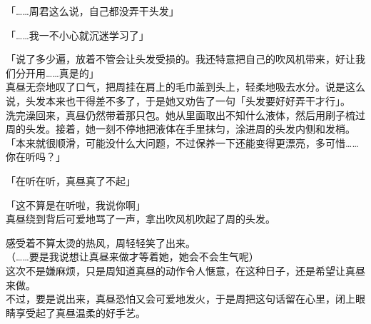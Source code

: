 「……周君这么说，自己都没弄干头发」

「……我一不小心就沉迷学习了」

「说了多少遍，放着不管会让头发受损的。我还特意把自己的吹风机带来，好让我们分开用……真是的」\\

真昼无奈地叹了口气，把周挂在肩上的毛巾盖到头上，轻柔地吸去水分。说是这么说，头发本来也干得差不多了，于是她又劝告了一句「头发要好好弄干才行」。\\

洗完澡回来，真昼仍然带着那只包。她从里面取出不知什么液体，然后用刷子梳过周的头发。接着，她一刻不停地把液体在手里抹匀，涂进周的头发内侧和发梢。\\

「本来就很顺滑，可能没什么大问题，不过保养一下还能变得更漂亮，多可惜……你在听吗？」

「在听在听，真昼真了不起」

「这不算是在听啦，我说你啊」\\

真昼绕到背后可爱地骂了一声，拿出吹风机吹起了周的头发。

感受着不算太烫的热风，周轻轻笑了出来。\\

（……要是我说想让真昼来做才等着她，她会不会生气呢）\\

这次不是嫌麻烦，只是周知道真昼的动作令人惬意，在这种日子，还是希望让真昼来做。\\

不过，要是说出来，真昼恐怕又会可爱地发火，于是周把这句话留在心里，闭上眼睛享受起了真昼温柔的好手艺。

